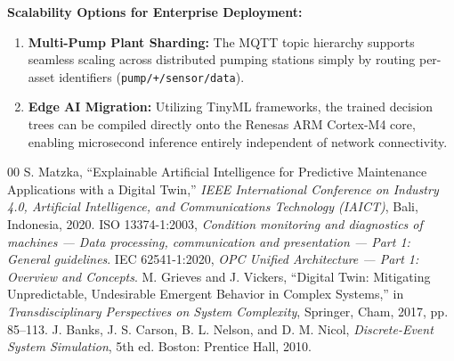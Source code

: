 \documentclass[11pt,a4paper]{article}
\begin{document}
\textbf{Scalability Options for Enterprise Deployment:}
\begin{enumerate}
    \item \textbf{Multi-Pump Plant Sharding:} The MQTT topic hierarchy supports seamless scaling across distributed pumping stations simply by routing per-asset identifiers (\texttt{pump/+/sensor/data}).
    \item \textbf{Edge AI Migration:} Utilizing TinyML frameworks, the trained decision trees can be compiled directly onto the Renesas ARM Cortex-M4 core, enabling microsecond inference entirely independent of network connectivity.
\end{enumerate}

\begin{thebibliography}{00}
 S. Matzka, ``Explainable Artificial Intelligence for Predictive Maintenance Applications with a Digital Twin,'' \emph{IEEE International Conference on Industry 4.0, Artificial Intelligence, and Communications Technology (IAICT)}, Bali, Indonesia, 2020.
 ISO 13374-1:2003, \emph{Condition monitoring and diagnostics of machines --- Data processing, communication and presentation --- Part 1: General guidelines}.
 IEC 62541-1:2020, \emph{OPC Unified Architecture --- Part 1: Overview and Concepts}.
 M. Grieves and J. Vickers, ``Digital Twin: Mitigating Unpredictable, Undesirable Emergent Behavior in Complex Systems,'' in \emph{Transdisciplinary Perspectives on System Complexity}, Springer, Cham, 2017, pp. 85--113.
 J. Banks, J. S. Carson, B. L. Nelson, and D. M. Nicol, \emph{Discrete-Event System Simulation}, 5th ed. Boston: Prentice Hall, 2010.
\end{thebibliography}
\end{document}
